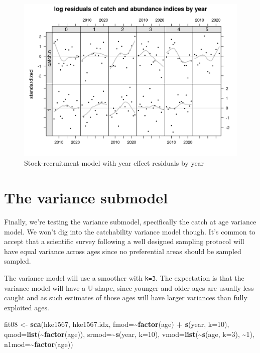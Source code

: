 \documentclass[
]{book}
\newenvironment{Shaded}{\begin{snugshade}}{\end{snugshade}}
\newcommand{\AttributeTok}[1]{\textcolor[rgb]{0.13,0.29,0.53}{#1}}
\newcommand{\DecValTok}[1]{\textcolor[rgb]{0.00,0.00,0.81}{#1}}
\newcommand{\FunctionTok}[1]{\textcolor[rgb]{0.13,0.29,0.53}{\textbf{#1}}}
\newcommand{\NormalTok}[1]{#1}
\newcommand{\OtherTok}[1]{\textcolor[rgb]{0.56,0.35,0.01}{#1}}
\newcommand{\SpecialCharTok}[1]{\textcolor[rgb]{0.81,0.36,0.00}{\textbf{#1}}}
\begin{document}
\begin{figure}
\centering
\includegraphics{_bookdown_files/_main_files/figure-html/srresbyyear-1.png}
\caption{\label{fig:srresbyyear}Stock-recruitment model with year effect residuals by year}
\end{figure}

\hypertarget{the-variance-submodel}{%
\section{The variance submodel}\label{the-variance-submodel}}

Finally, we're testing the variance submodel, specifically the catch at age variance model. We won't dig into the catchability variance model though. It's common to accept that a scientific survey following a well designed sampling protocol will have equal variance across ages since no preferential areas should be sampled sampled.

The variance model will use a smoother with \texttt{k=3}. The expectation is that the variance model will have a U-shape, since younger and older ages are usually less caught and as such estimates of those ages will have larger variances than fully exploited ages.

\begin{Shaded}
\begin{Highlighting}[]
\NormalTok{fit08 }\OtherTok{\textless{}{-}} \FunctionTok{sca}\NormalTok{(hke1567, hke1567.idx,}
    \AttributeTok{fmod=}\SpecialCharTok{\textasciitilde{}}\FunctionTok{factor}\NormalTok{(age) }\SpecialCharTok{+} \FunctionTok{s}\NormalTok{(year, }\AttributeTok{k=}\DecValTok{10}\NormalTok{),}
    \AttributeTok{qmod=}\FunctionTok{list}\NormalTok{(}\SpecialCharTok{\textasciitilde{}}\FunctionTok{factor}\NormalTok{(age)),}
    \AttributeTok{srmod=}\SpecialCharTok{\textasciitilde{}}\FunctionTok{s}\NormalTok{(year, }\AttributeTok{k=}\DecValTok{10}\NormalTok{),}
    \AttributeTok{vmod=}\FunctionTok{list}\NormalTok{(}\SpecialCharTok{\textasciitilde{}}\FunctionTok{s}\NormalTok{(age, }\AttributeTok{k=}\DecValTok{3}\NormalTok{), }\SpecialCharTok{\textasciitilde{}}\DecValTok{1}\NormalTok{),}
    \AttributeTok{n1mod=}\SpecialCharTok{\textasciitilde{}}\FunctionTok{factor}\NormalTok{(age))}
\end{Highlighting}
\end{Shaded}
\end{document}
